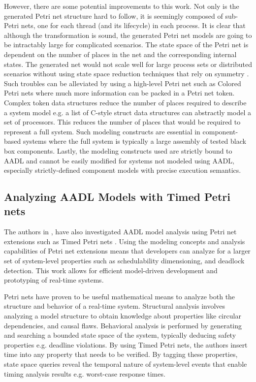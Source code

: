 However, there are some potential improvements to this work. Not only is the generated Petri net structure hard to follow, it is seemingly composed of sub-Petri nets, one for each thread (and its lifecycle) in each process. It is clear that although the transformation is sound, the generated Petri net models are going to be intractably large for complicated scenarios. The state space of the Petri net is dependent on the number of places in the net and the corresponding internal states. The generated net would not scale well for large process sets or distributed scenarios without using state space reduction techniques that rely on symmetry \cite{sistla2004symmetry}. Such troubles can be alleviated by using a high-level Petri net such as Colored Petri nets where much more information can be packed in a Petri net token. Complex token data structures reduce the number of places required to describe a system model e.g. a list of C-style struct data structures can abstractly model a set of processors. This reduces the number of places that would be required to represent a full system. Such modeling constructs are essential in component-based systems where the full system is typically a large assembly of tested black box components. Lastly, the modeling constructs used are strictly bound to AADL and cannot be easily modified for systems not modeled using AADL, especially strictly-defined component models with precise execution semantics. 

\subsection{Analyzing AADL Models with Timed Petri nets}

The authors in \cite{kordon_sn}, have also investigated AADL model analysis using Petri net extensions such as Timed Petri nets \cite{kordon2009}. Using the modeling concepts and analysis capabilities of Petri net extensions means that developers can analyze for a larger set of system-level properties such as schedulability dimensioning, and deadlock detection. This work allows for efficient model-driven development and prototyping of real-time systems. 

Petri nets have proven to be useful mathematical means to analyze both the structure and behavior of a real-time system. Structural analysis involves analyzing a model structure to obtain knowledge about properties like circular dependencies, and causal flaws. Behavioral analysis is performed by generating and searching a bounded state space of the system, typically deducing safety properties e.g. deadline violations. By using Timed Petri nets, the authors insert time into any property that needs to be verified. By tagging these properties, state space queries reveal the temporal nature of system-level events that enable timing analysis results e.g. worst-case response times.

